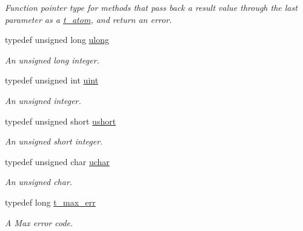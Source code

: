 \begin{DoxyCompactItemize}
\begin{DoxyCompactList}\small\item\em Function pointer type for methods that pass back a result value through the last parameter as a \hyperlink{structt__atom}{t\_\-atom}, and return an error. \item\end{DoxyCompactList}\item 
\hypertarget{group__datatypes_ga718b4eb2652c286f4d42dc18a8e71a1a}{
typedef unsigned long \hyperlink{group__datatypes_ga718b4eb2652c286f4d42dc18a8e71a1a}{ulong}}
\label{group__datatypes_ga718b4eb2652c286f4d42dc18a8e71a1a}

\begin{DoxyCompactList}\small\item\em An unsigned long integer. \item\end{DoxyCompactList}\item 
\hypertarget{group__datatypes_ga91ad9478d81a7aaf2593e8d9c3d06a14}{
typedef unsigned int \hyperlink{group__datatypes_ga91ad9478d81a7aaf2593e8d9c3d06a14}{uint}}
\label{group__datatypes_ga91ad9478d81a7aaf2593e8d9c3d06a14}

\begin{DoxyCompactList}\small\item\em An unsigned integer. \item\end{DoxyCompactList}\item 
\hypertarget{group__datatypes_gab95f123a6c9bcfee6a343170ef8c5f69}{
typedef unsigned short \hyperlink{group__datatypes_gab95f123a6c9bcfee6a343170ef8c5f69}{ushort}}
\label{group__datatypes_gab95f123a6c9bcfee6a343170ef8c5f69}

\begin{DoxyCompactList}\small\item\em An unsigned short integer. \item\end{DoxyCompactList}\item 
\hypertarget{group__datatypes_ga65f85814a8290f9797005d3b28e7e5fc}{
typedef unsigned char \hyperlink{group__datatypes_ga65f85814a8290f9797005d3b28e7e5fc}{uchar}}
\label{group__datatypes_ga65f85814a8290f9797005d3b28e7e5fc}

\begin{DoxyCompactList}\small\item\em An unsigned char. \item\end{DoxyCompactList}\item 
typedef long \hyperlink{group__datatypes_ga73edaae82b318855cc09fac994918165}{t\_\-max\_\-err}
\begin{DoxyCompactList}\small\item\em A Max error code. \item\end{DoxyCompactList}\end{DoxyCompactItemize}


